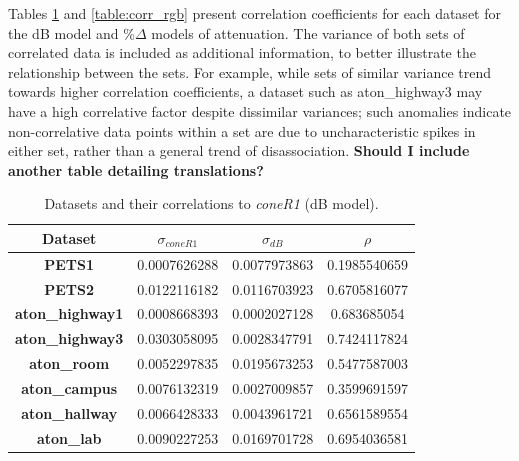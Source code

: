 \documentclass[12pt]{report}
\begin{document}
Tables \ref{table:corr_db} and \ref{table:corr_rgb} present correlation coefficients for each dataset for the dB model and \%$\Delta$ models of attenuation. The variance of both sets of correlated data is included as additional information, to better illustrate the relationship between the sets. For example, while sets of similar variance trend towards higher correlation coefficients, a dataset such as aton\_highway3 may have a high correlative factor despite dissimilar variances; such anomalies indicate non-correlative data points within a set are due to uncharacteristic spikes in either set, rather than a general trend of disassociation. \textbf{Should I include another table detailing translations?}

\begin{table}
\begin{tabular}{ |c|c|c|c| }
	\hline
	\textbf{Dataset} & \textbf{$\sigma_{coneR1}$} & \textbf{$\sigma_{dB}$} & \textbf{$\rho$} \\
	\hline
	\hline
	\textbf{PETS1} & 0.0007626288 & 0.0077973863 & 0.1985540659 \\
	\hline
	\textbf{PETS2} & 0.0122116182 & 0.0116703923 & 0.6705816077 \\
	\hline
	\textbf{aton\_highway1} & 0.0008668393 & 0.0002027128 & 0.683685054 \\
	\hline
	\textbf{aton\_highway3} & 0.0303058095 & 0.0028347791 &  0.7424117824 \\
	\hline
	\textbf{aton\_room} & 0.0052297835 & 0.0195673253 &  0.5477587003 \\
	\hline
	\textbf{aton\_campus} & 0.0076132319 & 0.0027009857 &  0.3599691597 \\
	\hline
	\textbf{aton\_hallway} & 0.0066428333 & 0.0043961721 &  0.6561589554 \\
	\hline
	\textbf{aton\_lab} & 0.0090227253 & 0.0169701728 &  0.6954036581 \\
	\hline
\end{tabular}
\caption{Datasets and their correlations to \textit{coneR1} (dB model).}
\label{table:corr_db}
\end{table}
\end{document}
